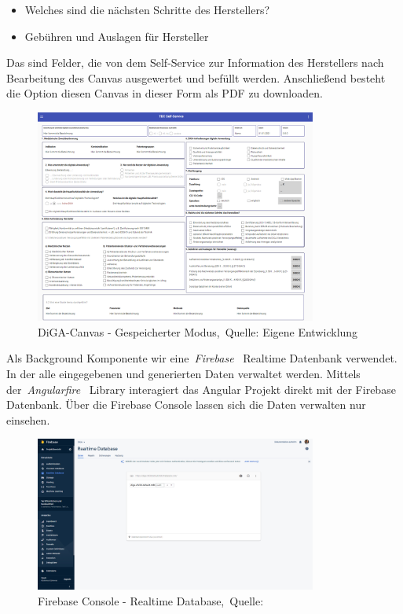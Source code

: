 \begin{itemize}
	\item Welches sind die nächsten Schritte des Herstellers?
	\item Gebühren und Auslagen für Hersteller
\end{itemize}
 Das sind Felder, die von dem Self-Service zur Information des Herstellers nach Bearbeitung des Canvas ausgewertet und befüllt werden. Anschließend besteht die Option diesen Canvas in dieser Form als PDF zu downloaden.
  \begin{figure}[H]
  	\centering
  	\includegraphics[width=350px, keepaspectratio]{assets/onSave.png}
  	\caption[DiGA-Canvas - Gespeicherter Modus]{DiGA-Canvas - Gespeicherter Modus,~Quelle: Eigene Entwicklung}
  \end{figure}
Als Background Komponente wir eine~\textit{Firebase}~\cite{firebase} Realtime Datenbank verwendet. In der alle eingegebenen und generierten Daten verwaltet werden. Mittels der~\textit{Angularfire}~\cite{angularfire} Library interagiert das Angular Projekt direkt mit der Firebase Datenbank. Über die Firebase Console lassen sich die Daten verwalten nur einsehen.
  
    \begin{figure}[H]
  	\centering
  	\includegraphics[width=350px, keepaspectratio]{assets/firebaseConsole.png}
  	\caption[Firebase Console - Realtime Database]{Firebase Console - Realtime Database,~Quelle:~\cite{firebase}}
  \end{figure}